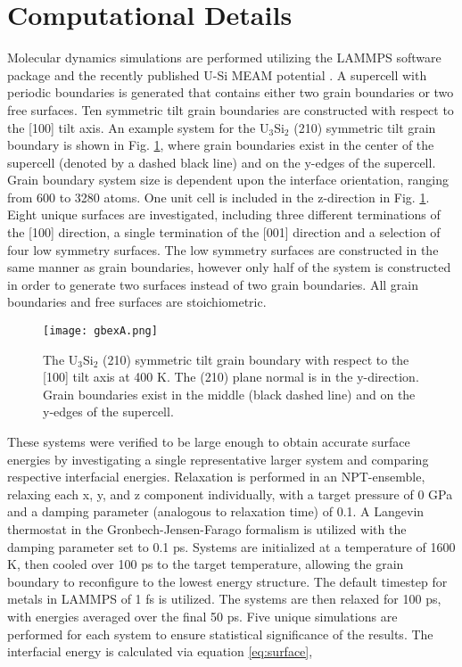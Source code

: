 \documentclass[review]{elsarticle}
\begin{document}
\section{Computational Details}
Molecular dynamics simulations are performed utilizing the LAMMPS \cite{plimpton1995} software package and the recently published U-Si MEAM potential \cite{beelerUSi}. A supercell with periodic boundaries is generated that contains either two grain boundaries or two free surfaces. Ten symmetric tilt grain boundaries are constructed with respect to the [100] tilt axis. An example system for the U$_{3}$Si$_{2}$ (210) symmetric tilt grain boundary is shown in Fig. \ref{fig:gbex}, where grain boundaries exist in the center of the supercell (denoted by a dashed black line) and on the y-edges of the supercell. Grain boundary system size is dependent upon the interface orientation, ranging from 600 to 3280 atoms. One unit cell is included in the z-direction in Fig. \ref{fig:gbex}. Eight unique surfaces are investigated, including three different terminations of the [100] direction, a single termination of the [001] direction and a selection of four low symmetry surfaces. The low symmetry surfaces are constructed in the same manner as grain boundaries, however only half of the system is constructed in order to generate two surfaces instead of two grain boundaries. All grain boundaries and free surfaces are stoichiometric. 

\begin{figure}[h]
 \centering
 \texttt{[image: gbexA.png]} 
 \caption{The U$_{3}$Si$_{2}$ (210) symmetric tilt grain boundary with respect to the [100] tilt axis at 400 K. The (210) plane normal is in the y-direction. Grain boundaries exist in the middle (black dashed line) and on the y-edges of the supercell. }
 \label{fig:gbex}
\end{figure}

These systems were verified to be large enough to obtain accurate surface energies by investigating a single representative larger system and comparing respective interfacial energies. Relaxation is performed in an NPT-ensemble, relaxing each x, y, and z component individually, with a target pressure of 0 GPa and a damping parameter (analogous to relaxation time) of 0.1. A Langevin thermostat in the Gronbech-Jensen-Farago \cite{gjf2014} formalism is utilized with the damping parameter set to 0.1 ps. Systems are initialized at a temperature of 1600 K, then cooled over 100 ps to the target temperature, allowing the grain boundary to reconfigure to the lowest energy structure. The default timestep for metals in LAMMPS of 1 fs is utilized. The systems are then relaxed for 100 ps, with energies averaged over the final 50 ps. Five unique simulations are performed for each system to ensure statistical significance of the results. The interfacial energy is calculated via equation \ref{eq:surface},
\end{document}
